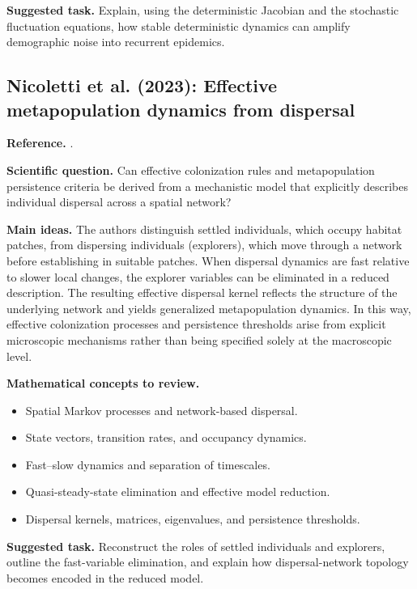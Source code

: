\noindent\textbf{Suggested task.} Explain, using the deterministic Jacobian
and the stochastic fluctuation equations, how stable deterministic dynamics
can amplify demographic noise into recurrent epidemics.

\subsection{Nicoletti et al. (2023): Effective metapopulation dynamics from dispersal}
\label{subsec:metapopulation}
\noindent\textbf{Reference.} \citet{NicolettiEtAl2023Metapopulation}.

\medskip\noindent\textbf{Scientific question.}
Can effective colonization rules and metapopulation persistence criteria be
derived from a mechanistic model that explicitly describes individual
dispersal across a spatial network?

\medskip\noindent\textbf{Main ideas.}
The authors distinguish settled individuals, which occupy habitat patches,
from dispersing individuals (explorers), which move through a network before
establishing in suitable patches. When dispersal dynamics are fast relative
to slower local changes, the explorer variables can be eliminated in a
reduced description. The resulting effective dispersal kernel reflects the
structure of the underlying network and yields generalized metapopulation
dynamics. In this way, effective colonization processes and persistence
thresholds arise from explicit microscopic mechanisms rather than being
specified solely at the macroscopic level.

\medskip\noindent\textbf{Mathematical concepts to review.}
\begin{itemize}
  \item Spatial Markov processes and network-based dispersal.
  \item State vectors, transition rates, and occupancy dynamics.
  \item Fast--slow dynamics and separation of timescales.
  \item Quasi-steady-state elimination and effective model reduction.
  \item Dispersal kernels, matrices, eigenvalues, and persistence thresholds.
\end{itemize}

\noindent\textbf{Suggested task.} Reconstruct the roles of settled
individuals and explorers, outline the fast-variable elimination, and
explain how dispersal-network topology becomes encoded in the reduced model.

